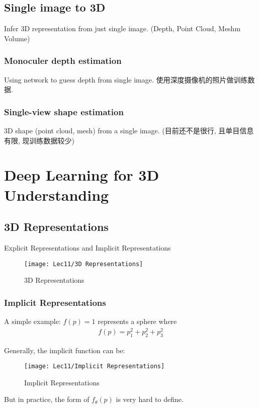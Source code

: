 \subsection{Single image to 3D}
Infer 3D representation from just single image. (Depth, Point Cloud, Meshm Volume)

\subsubsection{Monoculer depth estimation}
Using network to \textcolor{light_red}{guess} depth from single image. 使用深度摄像机的照片做训练数据. 

\subsubsection{Single-view shape estimation}
3D shape (point cloud, mesh) from a single image. (目前还不是很行, 且单目信息有限, 现训练数据较少)

\section{Deep Learning for 3D Understanding}

\subsection{3D Representations}
Explicit Representations and Implicit Representations
\begin{figure}[H]
    \centering
    \texttt{[image: Lec11/3D Representations]}
    \caption{3D Representations}
\end{figure}

\subsubsection{Implicit Representations}
A simple example: $f(p)=1$ represents a sphere where
\begin{align*}
    f(p)=p_1^2+p_2^2+p_3^2
\end{align*}

Generally, the implicit function can be:
\begin{figure}[H]
    \centering
    \texttt{[image: Lec11/Implicit Representations]}
    \caption{Implicit Representations}
\end{figure}

But in practice, the form of $f_{\theta}(p)$ is very hard to define. 

